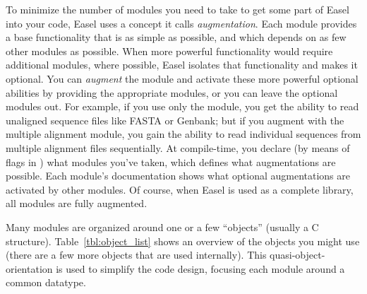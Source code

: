 To minimize the number of modules you need to take to get some part of
Easel into your code, Easel uses a concept it calls
\emph{augmentation}. Each module provides a base functionality that is
as simple as possible, and which depends on as few other modules as
possible. When more powerful functionality would require additional
modules, where possible, Easel isolates that functionality and makes
it optional. You can \emph{augment} the module and activate these more
powerful optional abilities by providing the appropriate modules, or
you can leave the optional modules out.  For example, if you use only
the  module, you get the ability to read unaligned
sequence files like FASTA or Genbank; but if you augment 
with the  multiple alignment module, you gain the ability
to read individual sequences from multiple alignment files
sequentially. At compile-time, you declare (by means of
 flags in ) what modules you've taken,
which defines what augmentations are possible. Each module's
documentation shows what optional augmentations are activated by other
modules. Of course, when Easel is used as a complete
 library, all modules are fully augmented.




Many modules are organized around one or a few ``objects'' (usually a
C structure). Table~\ref{tbl:object_list} shows an overview of the
objects you might use (there are a few more objects that are used
internally). This quasi-object-orientation is used to simplify the
code design, focusing each module around a common datatype. 

